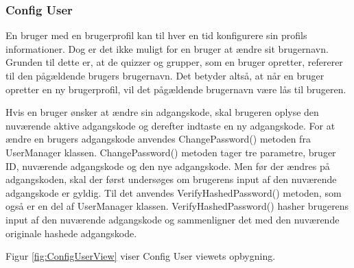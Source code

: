 \subsubsection{Config User}

En bruger med en brugerprofil kan til hver en tid konfigurere sin profils informationer. Dog er det ikke muligt for en bruger at ændre sit brugernavn. Grunden til dette er, at de quizzer og grupper, som en bruger opretter, refererer til den pågældende brugers brugernavn. Det betyder altså, at når en bruger opretter en ny brugerprofil, vil det pågældende brugernavn være lås til brugeren. 

Hvis en bruger ønsker at ændre sin adgangskode, skal brugeren oplyse den nuværende aktive adgangskode og derefter indtaste en ny adgangskode. For at ændre en brugers adgangskode anvendes ChangePassword() metoden fra UserManager klassen. ChangePassword() metoden tager tre parametre, bruger ID, nuværende adgangskode og den nye adgangskode. Men før der ændres på adgangskoden, skal der først undersøges om brugerens input af den nuværende adgangskode er gyldig. Til det anvendes VerifyHashedPassword() metoden, som også er en del af UserManager klassen. VerifyHashedPassword() hasher brugerens input af den nuværende adgangskode og sammenligner det med den nuværende originale hashede adgangskode. 

Figur \ref{fig:ConfigUserView} viser Config User viewets opbygning. 

